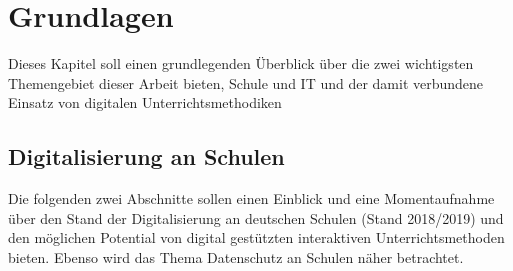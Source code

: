 \section{Grundlagen}\label{sec:grundlagen}
Dieses Kapitel soll einen grundlegenden Überblick über die zwei wichtigsten Themengebiet dieser Arbeit bieten, Schule und IT und der damit verbundene Einsatz von digitalen Unterrichtsmethodiken
\subsection{Digitalisierung an Schulen}\label{sec:digianschulen}
Die folgenden zwei Abschnitte sollen einen Einblick und eine Momentaufnahme über den Stand der Digitalisierung an deutschen Schulen (Stand 2018/2019) und den möglichen Potential von digital gestützten interaktiven Unterrichtsmethoden bieten. Ebenso wird das Thema Datenschutz an Schulen näher betrachtet.

